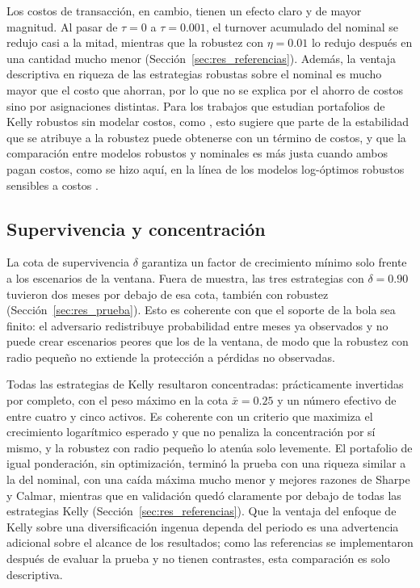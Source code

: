 Los costos de transacción, en cambio, tienen un efecto claro y de mayor magnitud. Al pasar de $\tau=0$ a $\tau=0.001$, el turnover acumulado del nominal se redujo casi a la mitad, mientras que la robustez con $\eta=0.01$ lo redujo después en una cantidad mucho menor (Sección~\ref{sec:res_referencias}). Además, la ventaja descriptiva en riqueza de las estrategias robustas sobre el nominal es mucho mayor que el costo que ahorran, por lo que no se explica por el ahorro de costos sino por asignaciones distintas. Para los trabajos que estudian portafolios de Kelly robustos sin modelar costos, como \citet{sunzou2025}, esto sugiere que parte de la estabilidad que se atribuye a la robustez puede obtenerse con un término de costos, y que la comparación entre modelos robustos y nominales es más justa cuando ambos pagan costos, como se hizo aquí, en la línea de los modelos log-óptimos robustos sensibles a costos \citep{hsiehyu2024}.

\subsection{Supervivencia y concentración}\label{sec:disc_supervivencia}

La cota de supervivencia $\delta$ garantiza un factor de crecimiento mínimo solo frente a los escenarios de la ventana. Fuera de muestra, las tres estrategias con $\delta=0.90$ tuvieron dos meses por debajo de esa cota, también con robustez (Sección~\ref{sec:res_prueba}). Esto es coherente con que el soporte de la bola sea finito: el adversario redistribuye probabilidad entre meses ya observados y no puede crear escenarios peores que los de la ventana, de modo que la robustez con radio pequeño no extiende la protección a pérdidas no observadas.

Todas las estrategias de Kelly resultaron concentradas: prácticamente invertidas por completo, con el peso máximo en la cota $\bar x=0.25$ y un número efectivo de entre cuatro y cinco activos. Es coherente con un criterio que maximiza el crecimiento logarítmico esperado \citep{kelly1956} y que no penaliza la concentración por sí mismo, y la robustez con radio pequeño lo atenúa solo levemente. El portafolio de igual ponderación, sin optimización, terminó la prueba con una riqueza similar a la del nominal, con una caída máxima mucho menor y mejores razones de Sharpe y Calmar, mientras que en validación quedó claramente por debajo de todas las estrategias Kelly (Sección~\ref{sec:res_referencias}). Que la ventaja del enfoque de Kelly sobre una diversificación ingenua dependa del periodo es una advertencia adicional sobre el alcance de los resultados; como las referencias se implementaron después de evaluar la prueba y no tienen contrastes, esta comparación es solo descriptiva.

